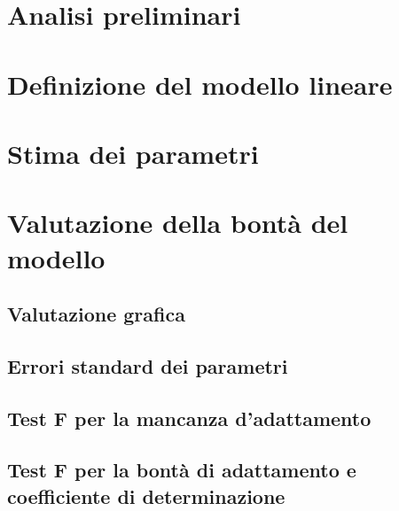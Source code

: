 \documentclass[a4paper,12pt,oneside]{book}
\begin{document}
\hypertarget{analisi-preliminari}{%
\section{Analisi preliminari}\label{analisi-preliminari}}

\hypertarget{definizione-del-modello-lineare}{%
\section{Definizione del modello lineare}\label{definizione-del-modello-lineare}}

\hypertarget{stima-dei-parametri-2}{%
\section{Stima dei parametri}\label{stima-dei-parametri-2}}

\hypertarget{valutazione-della-bontuxe0-del-modello}{%
\section{Valutazione della bontà del modello}\label{valutazione-della-bontuxe0-del-modello}}

\hypertarget{valutazione-grafica}{%
\subsection{Valutazione grafica}\label{valutazione-grafica}}

\hypertarget{errori-standard-dei-parametri}{%
\subsection{Errori standard dei parametri}\label{errori-standard-dei-parametri}}

\hypertarget{test-f-per-la-mancanza-dadattamento}{%
\subsection{Test F per la mancanza d'adattamento}\label{test-f-per-la-mancanza-dadattamento}}

\hypertarget{test-f-per-la-bontuxe0-di-adattamento-e-coefficiente-di-determinazione}{%
\subsection{Test F per la bontà di adattamento e coefficiente di determinazione}\label{test-f-per-la-bontuxe0-di-adattamento-e-coefficiente-di-determinazione}}
\end{document}
